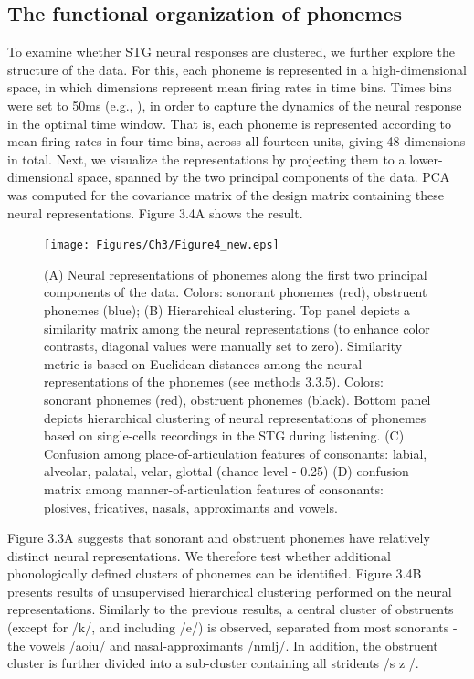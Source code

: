 \subsection{The functional organization of phonemes}
To examine whether STG neural responses are clustered, we further explore the structure of the data. For this, each phoneme is represented in a high-dimensional space, in which dimensions represent mean firing rates in time bins. Times bins were set to 50ms (e.g., \citealp{chan2013speech, Mesgarani2014}), in order to capture the dynamics of the neural response in the optimal time window. That is, each phoneme is represented according to mean firing rates in four time bins, across all fourteen units, giving 48 dimensions in total. Next, we visualize the representations by projecting them to a lower-dimensional space, spanned by the two principal components of the data. PCA was computed for the covariance matrix of the design matrix containing these neural representations. Figure 3.4A shows the result.

\begin{figure}[h]
\vspace{.3in}
\texttt{[image: Figures/Ch3/Figure4\_new.eps]}
\caption{(A) Neural representations of phonemes along the first two principal components of the data. Colors: sonorant phonemes (red), obstruent phonemes (blue); (B) Hierarchical clustering. Top panel depicts a similarity matrix among the neural representations (to enhance color contrasts, diagonal values were manually set to zero). Similarity metric is based on Euclidean distances among the neural representations of the phonemes (see methods 3.3.5). Colors: sonorant phonemes (red), obstruent phonemes (black). Bottom panel depicts hierarchical clustering of neural representations of phonemes based on single-cells recordings in the STG during listening. (C) Confusion among place-of-articulation features of consonants: labial, alveolar, palatal, velar, glottal (chance level - 0.25) (D) confusion matrix among manner-of-articulation features of consonants: plosives, fricatives, nasals, approximants and vowels.}
\end{figure}

Figure 3.3A suggests that sonorant and obstruent phonemes have relatively distinct neural representations. We therefore test whether additional phonologically defined clusters of phonemes can be identified. Figure 3.4B presents results of unsupervised hierarchical clustering performed on the neural representations. Similarly to the previous results, a central cluster of obstruents (except for /k/, and including /e/) is observed, separated from most sonorants - the vowels /aoiu/ and nasal-approximants /nmlj/. In addition, the obstruent cluster is further divided into a sub-cluster containing all stridents /s  z /. 

